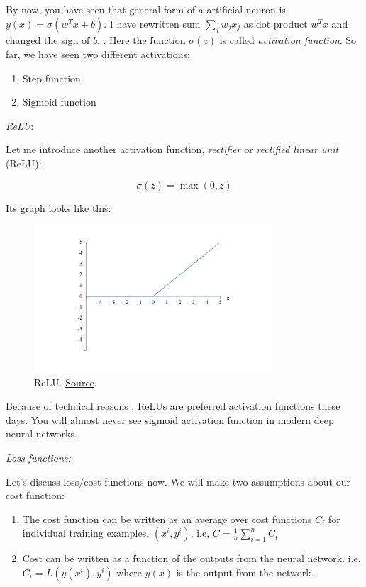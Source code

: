 \documentclass[a4paper]{tufte-handout}
\begin{document}
By now, you have seen that general form of a artificial neuron is
\(y(x) = \sigma\left( w^T x + b\right)\).
\protect\hypertarget{activation}{}{} { I have rewritten sum
\(\sum_j w_j x_j\) as dot product \(w^Tx\) and changed the sign of
\(b\). }. Here the function \(\sigma(z)\) is called \emph{activation
function}. So far, we have seen two different activations:

\begin{enumerate}
\item
  Step function
\item
  Sigmoid function
\end{enumerate}

\noindent \emph{ReLU}:

Let me introduce another activation function, \emph{rectifier} or
\emph{rectified linear unit} (ReLU):

\[\sigma(z) = \max(0, z)\]

Its graph looks like this: 

\begin{figure}
\includegraphics[height=55mm]{relu}
\caption{ ReLU.
\href{http://neuralnetworksanddeeplearning.com/chap3.html}{Source}. }
\end{figure}

Because of technical reasons 
,
ReLUs are preferred activation functions these days. You will almost
never see sigmoid activation function in modern deep neural networks.

\hfill

\noindent \emph{Loss functions:}

Let's discuss loss/cost functions now. We will make two assumptions
about our cost function:

\begin{enumerate}
\item
  The cost function can be written as an average over cost functions
  \(C_i\) for individual training examples, \((x^i, y^i)\). i.e,
  \(C = \frac{1}{n} \sum_{i = 1}^{n} C_i\)
\item
  Cost can be written as a function of the outputs from the neural
  network. i.e, \(C_i = L(y(x^i), y^i)\) where \(y(x)\) is the output
  from the network.
\end{enumerate}
\end{document}
